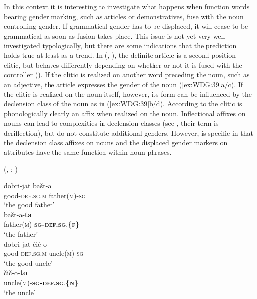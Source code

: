 \documentclass[output=collectionpaper]{langsci/langscibook}
\begin{document}
In this context it is interesting to investigate what happens when function words bearing gender marking, such as articles or demonstratives, fuse with the noun controlling gender. If grammatical gender has to be displaced, it will cease to be grammatical as soon as fusion takes place. This issue is not yet very well investigated typologically, but there are some indications that the prediction holds true at least as a trend. In  (, ), the definite article is a second position clitic, but behaves differently depending on whether or not it is fused with the controller (\citealt[315]{Enger2012}). If the clitic is realized on another word preceding the noun, such as an adjective, the article expresses the gender of the noun (\ref{ex:WDG:39}a/c). If the clitic is realized on the noun itself, however, its form can be influenced by the declension class of the noun as in (\ref{ex:WDG:39}b/d). According to \cite[134]{Dost2006} the clitic is phonologically clearly an affix when realized on the noun. Inflectional affixes on nouns can lead to complexities in declension classes (see , their term is deriflection), but do not constitute additional genders. However,  is specific in that the declension class affixes on nouns and the displaced gender markers on attributes have the same function within noun phrases.

\largerpage
\ea\label{ex:WDG:39}
 (, ; \citealt[315]{Enger2012})\\
\begin{xlist}
\ex
\gll	dobri-jat 	bašt-a \\
	good-\textsc{def.sg.m} 	father(\textsc{m})-\textsc{sg}\\
\glt	`the good father'\\
\ex
\gll 	bašt-a-\textbf{ta}\\
	father(\textsc{m})-\textbf{\textsc{sg-def.sg}}.\textbf{\{\textsc{f}\}}\\
\glt	`the father'\\
\ex
\gll 	dobri-jat 	čič-o \\
	good-\textsc{def.sg.m} 	uncle(\textsc{m})-\textsc{sg}\\
\glt	`the good uncle'\\
\ex
\gll 	čič-o-\textbf{to}\\
	uncle(\textsc{m})-\textbf{\textsc{sg-def.sg}}.\textbf{\{\textsc{n}\}}\\
\glt	`the uncle'\\
\end{xlist}
\z
\end{document}
